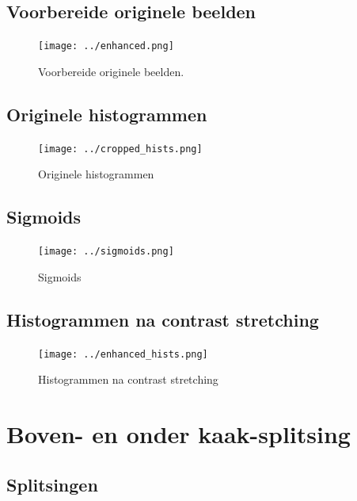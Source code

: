 \documentclass[10pt,a4paper]{article}
\begin{document}
\subsection*{Voorbereide originele beelden}
\label{appendix:prepared-originals}

\begin{figure}[H]
\centering
\texttt{[image: ../enhanced.png]}
\caption{Voorbereide originele beelden.}
\label{fig:prepared-originals}
\end{figure}

\subsection*{Originele histogrammen}
\label{appendix:cropped-histograms}

\begin{figure}[H]
\centering
\texttt{[image: ../cropped\_hists.png]}
\caption{Originele histogrammen}
\label{fig:cropped-histograms}
\end{figure}

\subsection*{Sigmoids}
\label{appendix:sigmoids}

\begin{figure}[H]
\centering
\texttt{[image: ../sigmoids.png]}
\caption{Sigmoids}
\label{fig:sigmoids}
\end{figure}

\subsection*{Histogrammen na contrast stretching}
\label{appendix:enhanced-histograms}

\begin{figure}[H]
\centering
\texttt{[image: ../enhanced\_hists.png]}
\caption{Histogrammen na contrast stretching}
\label{fig:enhanced-histograms}
\end{figure}

\section*{Boven- en onder kaak-splitsing}
\label{appendix:jaw-splits}

\subsection*{Splitsingen}
\end{document}
